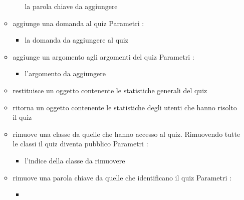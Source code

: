 \begin{itemize}
\begin{itemize}
\begin{itemize}
la parola chiave da aggiungere
\end{itemize}
\item {}
\newline
aggiunge una domanda al quiz
\newline
Parametri :
\begin{itemize}
\item {}
\newline
la domanda da aggiungere al quiz
\end{itemize}
\item {}
\newline
aggiunge un argomento agli argomenti del quiz
\newline
Parametri :
\begin{itemize}
\item {}
\newline
l'argomento da aggiungere
\end{itemize}
\item {}
\newline
restituisce un oggetto contenente le statistiche generali del quiz
\newline
\item {}
\newline
ritorna un oggetto contenente le statistiche degli utenti che hanno risolto il quiz
\newline
\item {}
\newline
rimuove una classe da quelle che hanno accesso al quiz. Rimuovendo tutte le classi il quiz diventa pubblico
\newline
Parametri :
\begin{itemize}
\item {}
\newline
l'indice della classe da rimuovere
\end{itemize}
\item {}
\newline
rimuove una parola chiave da quelle che identificano il quiz
\newline
Parametri :
\begin{itemize}
\item {}

\end{itemize}
\end{itemize}
\end{itemize}
